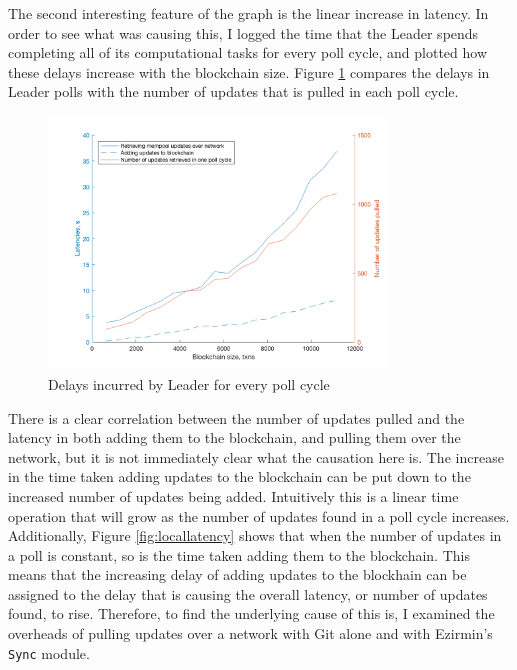 \documentclass[12pt,a4paper,twoside,openright]{report}
\begin{document}
	The second interesting feature of the graph is the linear increase in latency. 
	In order to see what was causing this, I logged the time that the Leader spends completing all of its computational tasks for every poll cycle, and plotted how these delays increase with the blockchain size.
	Figure \ref{figs:leaderdelays} compares the delays in Leader polls with the number of updates that is pulled in each poll cycle.
	\begin{figure}
		\centering
		\includegraphics[width=0.8\textwidth]{figs/leader_delays_num_pulled.png}
		\caption{Delays incurred by Leader for every poll cycle}
		\label{figs:leaderdelays}
	\end{figure}
	There is a clear correlation between the number of updates pulled and the latency in both adding them to the blockchain, and pulling them over the network, but it is not immediately clear what the causation here is.
	The increase in the time taken adding updates to the blockchain can be put down to the increased number of updates being added. 
	Intuitively this is a linear time operation that will grow as the number of updates found in a poll cycle increases.
	Additionally, Figure \ref{fig:locallatency} shows that when the number of updates in a poll is constant, so is the time taken adding them to the blockchain.
	This means that the increasing delay of adding updates to the blockhain can be assigned to the delay that is causing the overall latency, or number of updates found, to rise.
	Therefore, to find the underlying cause of this is, I examined the overheads of pulling updates over a network with Git alone and with Ezirmin's \texttt{Sync} module.\\
\end{document}
